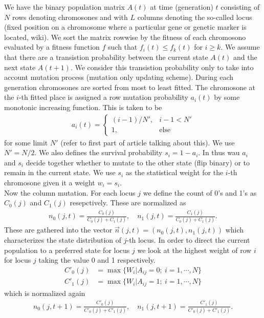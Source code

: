 We have the binary population matrix $A(t)$ at time (generation) $t$ consisting of $N$ rows denoting chromosones and with $L$ columns denoting the so-called locus (fixed position on a chromosome where a particular gene or genetic marker is located, wiki). We sort the matrix rowwise by the fitness of each chromosono evaluated by a fitness function $f$ such that $f_i(t) \le f_k(t)$ for $i \ge k$. We assume that there are a transistion probability between the current state $A(t)$ and the next state $A(t+1)$. We consider this transistion probability only to take into account mutation process (mutation only updating scheme). During each generation chromosones are sorted from most to least fitted. The chromosone at the $i$-th fitted place is assigned a row mutation probability $a_i(t)$ by some monotonic increasing function. This is taken to be 
\begin{align*}
  a_i(t) = 
  \begin{cases}
    (i-1)/N',& i-1 < N' \\
    1, &\text{else}
  \end{cases}
\end{align*}
for some limit $N'$ (refer to first part of article talking about this). We use $N' = N/2$. We also defines the survival probability $s_i = 1 - a_i$. In thus wau $a_i$ and $s_i$ decide together whether to mutate to the other state (flip binary) or to remain in the current state. We use $s_i$ as the statistical weight for the $i$-th chromosone given it a weight $w_i = s_i$.
\\
Now the column mutation. For each locus $j$ we define the count of 0's and 1's as $C_0(j)$ and $C_1(j)$ resepctively. These are normalized as
\begin{align*}
  n_0(j, t) = \frac{C_0(j)}{C_0(j) + C_1(j)}, \quad n_1(j, t) = \frac{C_1(j)}{C_0(j) + C_1(j)}.
\end{align*}
These are gathered into the vector $\vec{n}(j,t)=(n_0(j, t), n_1(j, t))$ which characterizes the state distribution of $j$-th locus. In order to direct the current population to a preferred state for locus $j$ we look at the highest weight of row $i$ for locus $j$ taking the value 0 and 1 respectively.
\begin{align*}
  C'_0(j) &= \max\{W_i | A_{ij} = 0; \ i = 1, \cdots, N\} \\
  C'_1(j) &= \max\{W_i | A_{ij} = 1; \ i = 1, \cdots, N\}
\end{align*}
which is normalized again
\begin{align*}
  n_0(j, t+1) = \frac{C'_0(j)}{C'_0(j) + C'_1(j)}, \quad n_1(j, t+1) = \frac{C'_1(j)}{C'_0(j) + C'_1(j)}.
\end{align*}

